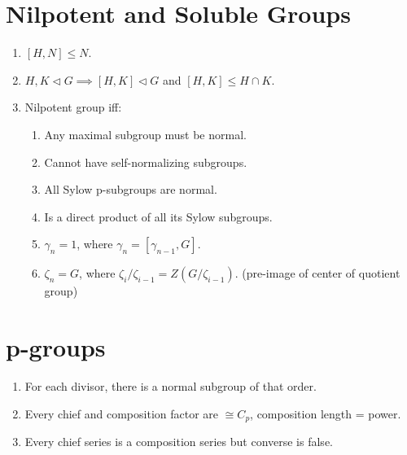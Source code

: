 \documentclass[10pt]{article}
\newcommand{\ltri}{\triangleleft}
\begin{document}
\begin{multicols*}{3}
  \section{Nilpotent and Soluble Groups}
  \begin{enumerate}
    \item $[H,N]\leq N$.
    \item $H,K\ltri G\implies [H,K]\ltri G$ and $[H,K]\leq H\cap K$.
    \item Nilpotent group iff:\begin{enumerate}
      \item Any maximal subgroup must be normal.
      \item Cannot have self-normalizing subgroups.
      \item All Sylow p-subgroups are normal.
      \item Is a direct product of all its Sylow subgroups.
      \item $\gamma_{n}={1}$, where $\gamma_{n}=[\gamma_{n-1},G]$.
      \item $\zeta_{n}=G$, where $\zeta_{i}/\zeta_{i-1}=Z(G/\zeta_{i-1})$. (pre-image of center
      of quotient group)
    \end{enumerate}
  \end{enumerate}

  \section{p-groups}
  \begin{enumerate}
    \item For each divisor, there is a normal subgroup of that order.
    \item Every chief and composition factor are $\cong C_{p}$, composition length = power.
    \item Every chief series is a composition series but converse is false.
  \end{enumerate}
\end{multicols*}
\end{document}
